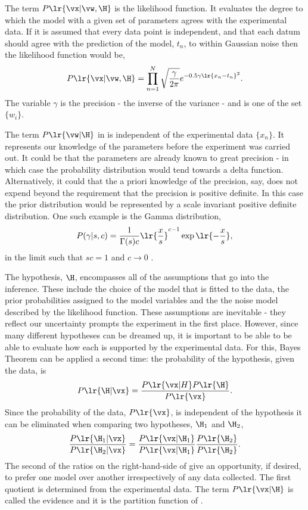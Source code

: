 {The term $P\lr{\vx|\vw,\H}$ is the likelihood function.
It evaluates the degree to which the model with a given set of parameters agrees with the experimental data.
If it is assumed that every data point is independent, and that each datum should agree with the prediction of the model, $t_n$, 
to within Gaussian noise
then the likelihood function would be,
\begin{align}
  P\lr{\vx|\vw,\H} = \prod_{n=1}^N \sqrt{\frac{\gamma}{2\pi}}e^{-0.5\gamma\lr{x_n-t_n}^2}.
\end{align}
The variable $\gamma$ is the precision - the inverse of the variance - and is one of the set $\{w_i\}$.

The term $P\lr{\vw|\H}$ in  is independent of the experimental data $\{x_n\}$.  
It  represents our knowledge of the parameters before the experiment was carried out.
It could be that the parameters are already known to great precision - 
in which case the probability distribution would tend towards a delta function.
Alternatively, it could that the a priori knowledge of the precision, say, 
does not expend beyond the requirement that the precision is positive definite.
In this case the prior distribution would be represented by a scale invariant positive definite distribution.
One such example is the Gamma distribution,
\begin{align}
  P(\gamma|s,c) = \frac{1}{\Gamma(s)c}\lr{\frac{x}{s}}^{c-1}\exp\lr{-\frac{x}{s}},
\label{eqn:Gamma}
\end{align}
in the limit such that $sc = 1$ and $c\rightarrow 0$ \cite{MacKay2003}.

The hypothesis, $\H$,  encompasses all of the assumptions that go into the inference.
These include the choice of the model that is fitted to the data, 
the prior probabilities assigned to the model variables and the 
the noise model described by the likelihood function.
These assumptions are inevitable - they reflect our uncertainty 
 prompts the experiment in the first place.
However, 
since many different hypotheses can be dreamed up,
it is important to be able to be able to evaluate how each is supported by the experimental data.
For this, Bayes Theorem can be applied a second time:
the probability of the hypothesis, given the data, is
\begin{align}
P\lr{\H | \vx } = \frac{P\lr{\vx|H}P\lr{\H}}{P\lr{\vx}}.
\label{eqn:BayesHyp}
\end{align}
Since the probability of the data, $P\lr{\vx}$, 
is independent of the hypothesis
it can be eliminated when comparing two hypotheses, $\H_1$ and $\H_2$,
\begin{align}
\frac{P\lr{\H_1 | \vx }}{P\lr{\H_2 | \vx }} = \frac{P\lr{\vx|\H_1}}{P\lr{\vx|\H_1}}\frac{P\lr{\H_2}}{P\lr{\H_2}}.
\label{eqn:ModelCmp}
\end{align}
The second of the ratios on the right-hand-side of 
give an opportunity, if desired, to prefer one model over another irrespectively of any data collected.
The first quotient is determined from the experimental data.
The term $P\lr{\vx|\H}$ is called the evidence and it is the partition function of  .

}
